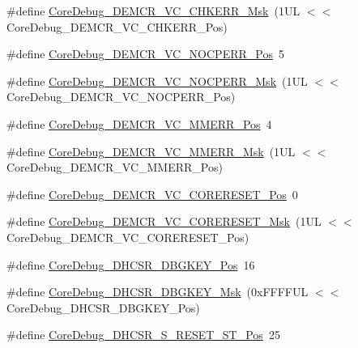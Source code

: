 \begin{DoxyCompactItemize}
\item 
\#define \hyperlink{group___c_m_s_i_s___core_debug_ga2f98b461d19746ab2febfddebb73da6f}{Core\+Debug\+\_\+\+D\+E\+M\+C\+R\+\_\+\+V\+C\+\_\+\+C\+H\+K\+E\+R\+R\+\_\+\+Msk}~(1\+U\+L $<$$<$ Core\+Debug\+\_\+\+D\+E\+M\+C\+R\+\_\+\+V\+C\+\_\+\+C\+H\+K\+E\+R\+R\+\_\+\+Pos)
\item 
\#define \hyperlink{group___c_m_s_i_s___core_debug_gac9d13eb2add61f610d5ced1f7ad2adf8}{Core\+Debug\+\_\+\+D\+E\+M\+C\+R\+\_\+\+V\+C\+\_\+\+N\+O\+C\+P\+E\+R\+R\+\_\+\+Pos}~5
\item 
\#define \hyperlink{group___c_m_s_i_s___core_debug_ga03ee58b1b02fdbf21612809034562f1c}{Core\+Debug\+\_\+\+D\+E\+M\+C\+R\+\_\+\+V\+C\+\_\+\+N\+O\+C\+P\+E\+R\+R\+\_\+\+Msk}~(1\+U\+L $<$$<$ Core\+Debug\+\_\+\+D\+E\+M\+C\+R\+\_\+\+V\+C\+\_\+\+N\+O\+C\+P\+E\+R\+R\+\_\+\+Pos)
\item 
\#define \hyperlink{group___c_m_s_i_s___core_debug_ga444454f7c7748e76cd76c3809c887c41}{Core\+Debug\+\_\+\+D\+E\+M\+C\+R\+\_\+\+V\+C\+\_\+\+M\+M\+E\+R\+R\+\_\+\+Pos}~4
\item 
\#define \hyperlink{group___c_m_s_i_s___core_debug_gad420a9b60620584faaca6289e83d3a87}{Core\+Debug\+\_\+\+D\+E\+M\+C\+R\+\_\+\+V\+C\+\_\+\+M\+M\+E\+R\+R\+\_\+\+Msk}~(1\+U\+L $<$$<$ Core\+Debug\+\_\+\+D\+E\+M\+C\+R\+\_\+\+V\+C\+\_\+\+M\+M\+E\+R\+R\+\_\+\+Pos)
\item 
\#define \hyperlink{group___c_m_s_i_s___core_debug_ga9fcf09666f7063a7303117aa32a85d5a}{Core\+Debug\+\_\+\+D\+E\+M\+C\+R\+\_\+\+V\+C\+\_\+\+C\+O\+R\+E\+R\+E\+S\+E\+T\+\_\+\+Pos}~0
\item 
\#define \hyperlink{group___c_m_s_i_s___core_debug_ga906476e53c1e1487c30f3a1181df9e30}{Core\+Debug\+\_\+\+D\+E\+M\+C\+R\+\_\+\+V\+C\+\_\+\+C\+O\+R\+E\+R\+E\+S\+E\+T\+\_\+\+Msk}~(1\+U\+L $<$$<$ Core\+Debug\+\_\+\+D\+E\+M\+C\+R\+\_\+\+V\+C\+\_\+\+C\+O\+R\+E\+R\+E\+S\+E\+T\+\_\+\+Pos)
\item 
\#define \hyperlink{group___c_m_s_i_s___core_debug_gac91280edd0ce932665cf75a23d11d842}{Core\+Debug\+\_\+\+D\+H\+C\+S\+R\+\_\+\+D\+B\+G\+K\+E\+Y\+\_\+\+Pos}~16
\item 
\#define \hyperlink{group___c_m_s_i_s___core_debug_ga1ce997cee15edaafe4aed77751816ffc}{Core\+Debug\+\_\+\+D\+H\+C\+S\+R\+\_\+\+D\+B\+G\+K\+E\+Y\+\_\+\+Msk}~(0x\+F\+F\+F\+F\+U\+L $<$$<$ Core\+Debug\+\_\+\+D\+H\+C\+S\+R\+\_\+\+D\+B\+G\+K\+E\+Y\+\_\+\+Pos)
\item 
\#define \hyperlink{group___c_m_s_i_s___core_debug_ga6f934c5427ea057394268e541fa97753}{Core\+Debug\+\_\+\+D\+H\+C\+S\+R\+\_\+\+S\+\_\+\+R\+E\+S\+E\+T\+\_\+\+S\+T\+\_\+\+Pos}~25
$$
\end{DoxyCompactItemize}
